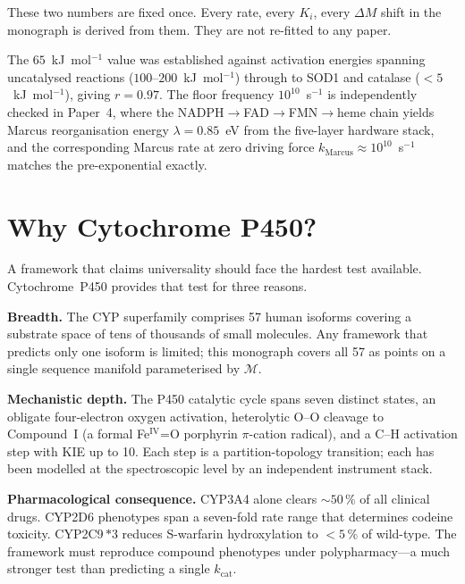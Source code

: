 \documentclass[11pt,twocolumn,a4paper]{article}
\theoremstyle{definition}
\theoremstyle{remark}
\newcommand{\Depth}{\mathcal{M}}
\begin{document}
\medskip

These two numbers are fixed once.  Every rate, every $K_i$, every $\Delta M$
shift in the monograph is derived from them.  They are not re-fitted to any
paper.

The $65$~kJ~mol$^{-1}$ value was established against activation energies
spanning uncatalysed reactions ($100$--$200$~kJ~mol$^{-1}$) through to SOD1
and catalase ($< 5$~kJ~mol$^{-1}$), giving $r = 0.97$.  The floor frequency
$10^{10}$~s$^{-1}$ is independently checked in Paper~4, where the
NADPH$\to$FAD$\to$FMN$\to$heme chain yields Marcus reorganisation energy
$\lambda = 0.85$~eV from the five-layer hardware stack, and the corresponding
Marcus rate at zero driving force $k_{\mathrm{Marcus}} \approx
10^{10}$~s$^{-1}$ matches the pre-exponential exactly.

\section{Why Cytochrome P450?}
\label{sec:why-p450}

A framework that claims universality should face the hardest test available.
Cytochrome~P450 provides that test for three reasons.

\textbf{Breadth.}  The CYP superfamily comprises 57 human isoforms covering a
substrate space of tens of thousands of small molecules.  Any framework that
predicts only one isoform is limited; this monograph covers all 57 as points
on a single sequence manifold parameterised by $\Depth$.

\textbf{Mechanistic depth.}  The P450 catalytic cycle spans seven distinct
states, an obligate four-electron oxygen activation, heterolytic O--O cleavage
to Compound~I (a formal Fe$^{\mathrm{IV}}$=O porphyrin $\pi$-cation radical),
and a C--H activation step with KIE up to 10.  Each step is a
partition-topology transition; each has been modelled at the spectroscopic
level by an independent instrument stack.

\textbf{Pharmacological consequence.}  CYP3A4 alone clears $\sim\!50\,\%$ of
all clinical drugs.  CYP2D6 phenotypes span a seven-fold rate range that
determines codeine toxicity.  CYP2C9\,$\ast$3 reduces S-warfarin hydroxylation
to $<5\,\%$ of wild-type.  The framework must reproduce compound phenotypes
under polypharmacy---a much stronger test than predicting a single
$k_{\mathrm{cat}}$.
\end{document}
